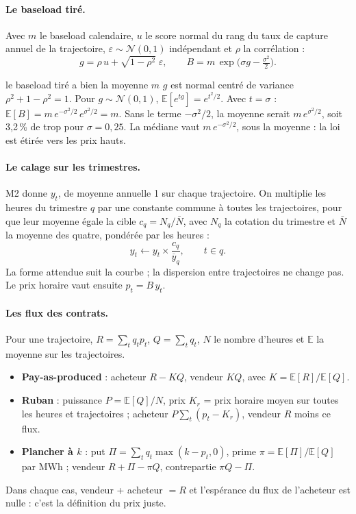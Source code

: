\documentclass[11pt,a4paper]{article}
\newcounter{qr}
\begin{document}
\paragraph{Le baseload tiré.} Avec $m$ le baseload calendaire, $u$ le score normal du rang du taux de capture annuel de la trajectoire, $\varepsilon \sim \mathcal N(0,1)$ indépendant et $\rho$ la corrélation :
\[
g = \rho\,u + \sqrt{1-\rho^2}\;\varepsilon,
\qquad
B = m\,\exp\!\big(\sigma g - \tfrac{\sigma^2}{2}\big).
\]

\begin{demo}{le baseload tiré a bien la moyenne $m$}
$g$ est normal centré de variance $\rho^2 + 1 - \rho^2 = 1$. Pour $g \sim \mathcal N(0,1)$, $\mathbb E[e^{tg}] = e^{t^2/2}$. Avec $t = \sigma$ : $\mathbb E[B] = m\,e^{-\sigma^2/2}\,e^{\sigma^2/2} = m$. Sans le terme $-\sigma^2/2$, la moyenne serait $m\,e^{\sigma^2/2}$, soit 3,2\,\% de trop pour $\sigma = 0{,}25$. La médiane vaut $m\,e^{-\sigma^2/2}$, sous la moyenne : la loi est étirée vers les prix hauts.
\end{demo}

\paragraph{Le calage sur les trimestres.} M2 donne $y_t$, de moyenne annuelle 1 sur chaque trajectoire. On multiplie les heures du trimestre $q$ par une constante commune à toutes les trajectoires, pour que leur moyenne égale la cible $c_q = N_q/\bar N$, avec $N_q$ la cotation du trimestre et $\bar N$ la moyenne des quatre, pondérée par les heures :
\[
y_t \leftarrow y_t \times \frac{c_q}{\overline{y}_q},
\qquad t \in q .
\]
La forme attendue suit la courbe ; la dispersion entre trajectoires ne change pas. Le prix horaire vaut ensuite $p_t = B\,y_t$.

\paragraph{Les flux des contrats.} Pour une trajectoire, $R = \sum_t q_t p_t$, $Q = \sum_t q_t$, $N$ le nombre d'heures et $\mathbb E$ la moyenne sur les trajectoires.
\begin{itemize}
\item \textbf{Pay-as-produced} : acheteur $R - KQ$, vendeur $KQ$, avec $K = \mathbb E[R]/\mathbb E[Q]$.
\item \textbf{Ruban} : puissance $P = \mathbb E[Q]/N$, prix $K_r$ = prix horaire moyen sur toutes les heures et trajectoires ; acheteur $P\sum_t (p_t - K_r)$, vendeur $R$ moins ce flux.
\item \textbf{Plancher à $k$} : put $\Pi = \sum_t q_t \max(k - p_t, 0)$, prime $\pi = \mathbb E[\Pi]/\mathbb E[Q]$ par MWh ; vendeur $R + \Pi - \pi Q$, contrepartie $\pi Q - \Pi$.
\end{itemize}
Dans chaque cas, vendeur + acheteur $= R$ et l'espérance du flux de l'acheteur est nulle : c'est la définition du prix juste.
\end{document}
